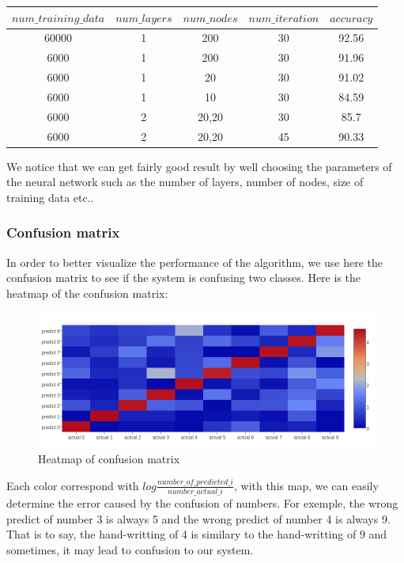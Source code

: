 \documentclass[paper=a4, french, 11pt]{scrartcl}
\begin{document}
\begin{small}
	\begin{tabular}{ |c|c|c|c|c| }
	\hline
	$num\_training\_data$ & $num\_layers$ & $num\_nodes$ & $num\_iteration$ & $accuracy$ \\
	\hline
	60000 & 1 & 200  & 30 & 92.56 \\
	\hline
	6000 & 1 & 200  & 30 & 91.96 \\
	\hline
	6000 & 1 & 20  & 30 & 91.02 \\
	\hline
	6000	 & 1 & 10  & 30 & 84.59 \\
	\hline
	6000 & 2 & 20,20  & 30 & 85.7\\
	\hline
	6000 & 2 & 20,20  & 45 & 90.33\\
	\hline
	\end{tabular}
\end{small}

We notice that we can get fairly good result by well choosing the parameters of the neural network such as the number of layers, number of nodes, size of training data etc.. 

\subsubsection{Confusion matrix}
In order to better visualize the performance of the algorithm, we use here the confusion matrix to see if the system is confusing two classes. Here is the heatmap of the confusion matrix:

\begin{figure}[h]
\vspace{-1ex}
\begin{center}
   \includegraphics[width=1.0\linewidth]{heatmap_log.png}
\end{center}
\vspace{-3ex}
\caption{Heatmap of confusion matrix}
\label{fig:heatmap}
\end{figure}

Each color correspond with $log\frac{number\_of\_predicted\_i}{number\_actual\_ i}$, with this map, we can easily determine the error caused by the confusion of numbers. For exemple, the wrong predict of number 3 is always 5 and the wrong predict of number 4 is always 9. That is to say, the hand-writting of 4 is similary to the hand-writting of 9 and sometimes, it may lead to confusion to our system.
\end{document}
